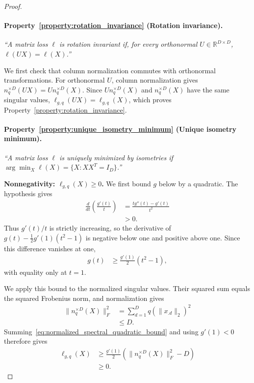 \begin{proof}
\paragraph{Property~\ref{property:rotation_invariance} (Rotation invariance).}
\emph{``A matrix loss $\ell$ is rotation invariant if, for every orthonormal $U\in\mathbb R^{D\times D}$, $\ell(UX)=\ell(X)$.''}

We first check that column normalization commutes with orthonormal transformations.
For orthonormal $U$, column normalization gives $n_q^{\times D}(UX)=U n_q^{\times D}(X)$.
Since $U n_q^{\times D}(X)$ and $n_q^{\times D}(X)$ have the same singular values, $\ell_{g,q}(UX)=\ell_{g,q}(X)$, which proves Property~\ref{property:rotation_invariance}.

\paragraph{Property~\ref{property:unique_isometry_minimum} (Unique isometry minimum).}
\emph{``A matrix loss $\ell$ is uniquely minimized by isometries if $\arg\min_X\ell(X)=\{X:XX^T=I_D\}$.''}

\textbf{Nonnegativity: $\ell_{g,q}(X)\geq0$.}
We first bound $g$ below by a quadratic.
The hypothesis gives
\begin{align}
\frac{d}{dt}\left(\frac{g'(t)}t\right)
&=\frac{tg''(t)-g'(t)}{t^2} \\
&>0.
\end{align}
Thus $g'(t)/t$ is strictly increasing, so the derivative of $g(t)-\frac12g'(1)(t^2-1)$ is negative below one and positive above one.
Since this difference vanishes at one,
\begin{align}
g(t)&\geq\frac{g'(1)}2(t^2-1),
\label{eq:normalized_spectral_quadratic_bound}
\end{align}
with equality only at $t=1$.

We apply this bound to the normalized singular values.
Their squared sum equals the squared Frobenius norm, and normalization gives
\begin{align}
\|n_q^{\times D}(X)\|_F^2
&=\sum_{d=1}^D q(\|x_{.d}\|_2)^2 \\
&\leq D.
\end{align}
Summing~\eqref{eq:normalized_spectral_quadratic_bound} and using $g'(1)<0$ therefore gives
\begin{align}
\ell_{g,q}(X)
&\geq\frac{g'(1)}2\left(\|n_q^{\times D}(X)\|_F^2-D\right) \\
&\geq0.
\end{align}


\end{proof}
